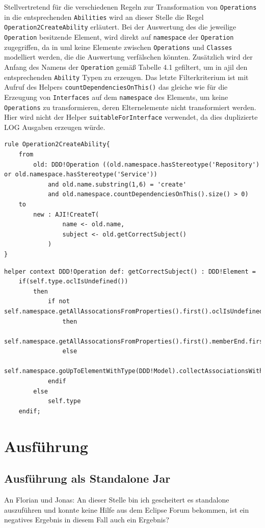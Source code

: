 \documentclass[
	oneside,  %
	ngerman, 
	final, 
	11pt, 
	a4paper, 
	1.1headlines, 
	headinclude=false, 
	footinclude=false, 
	mpinclude=false, 
	pagesize, 
	onecolumn, 
	titlepage, 
	parskip=half, 
	headsepline, 
	chapterprefix=false, 
	version=first, 
	listof=totoc, 
	bibliography=totoc, 
	toc=graduated, 
	fleqn
]{scrbook}
\begin{document}
Stellvertretend für die verschiedenen Regeln zur Transformation von \texttt{Operations} in die entsprechenden \texttt{Abilities} wird an dieser Stelle die Regel \texttt{Operation2CreateAbility} erläutert. Bei der Auswertung des die jeweilige \texttt{Operation} besitzende Element, wird direkt auf \texttt{namespace} der \texttt{Operation} zugegriffen, da in \ac{uml} keine Elemente zwischen \texttt{Operations} und \texttt{Classes} modelliert werden, die die Auswertung verfälschen könnten. Zusätzlich wird der Anfang des Namens der \texttt{Operation} gemäß Tabelle 4.1 gefiltert, um in \ac{ajil} den entsprechenden \texttt{Ability} Typen zu erzeugen. Das letzte Filterkriterium ist mit Aufruf des Helpers \texttt{countDependenciesOnThis()} das gleiche wie für die Erzeugung von \texttt{Interfaces} auf dem \texttt{namespace} des Elements, um keine \texttt{Operations} zu transformieren, deren Elternelemente nicht transformiert werden. Hier wird nicht der Helper \texttt{suitableForInterface} verwendet, da dies duplizierte LOG Ausgaben erzeugen würde.
\begin{lstlisting}[caption={Regel zur Erzeugung einer Ability},captionpos=b,label=Quellcode:Operation2CreateAbility] 
rule Operation2CreateAbility{
	from
		old: DDD!Operation ((old.namespace.hasStereotype('Repository') or old.namespace.hasStereotype('Service')) 
			and old.name.substring(1,6) = 'create' 
			and old.namespace.countDependenciesOnThis().size() > 0) 
	to
		new : AJI!CreateT( 
				name <- old.name,
				subject <- old.getCorrectSubject()
			)
}
\end{lstlisting}
\begin{lstlisting}[caption={Helper für das korrekte Subject einer Ability},captionpos=b,label=Quellcode:getCorrectSubject] 
helper context DDD!Operation def: getCorrectSubject() : DDD!Element =
	if(self.type.oclIsUndefined())
		then 
			if not self.namespace.getAllAssocationsFromProperties().first().oclIsUndefined()
				then
					self.namespace.getAllAssocationsFromProperties().first().memberEnd.first().type
				else
					self.namespace.goUpToElementWithType(DDD!Model).collectAssociationsWithMemberEnd(self.namespace).first().memberEnd.get(0).type
			endif
		else
			self.type
	endif;	
\end{lstlisting}
\section{Ausführung}
\subsection{Ausführung als Standalone Jar}
An Florian und Jonas: An dieser Stelle bin ich gescheitert es standalone auszuführen und konnte keine Hilfe aus dem Eclipse Forum bekommen, ist ein negatives Ergebnis in diesem Fall auch ein Ergebnis?
\end{document}
